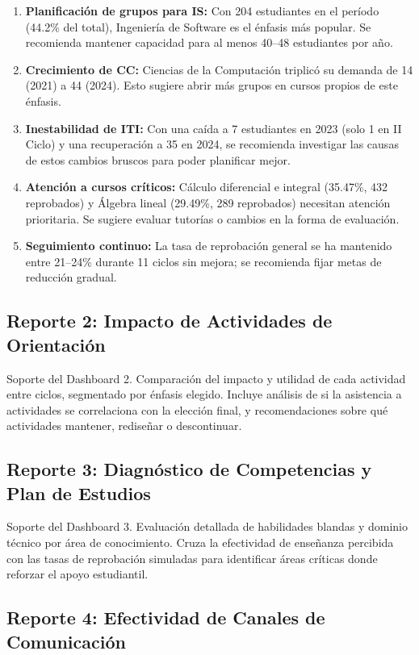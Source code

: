 \documentclass[12pt, letterpaper]{article}
\begin{document}
\begin{enumerate}
  \item \textbf{Planificación de grupos para IS:} Con 204 estudiantes en el período (44.2\% del total), Ingeniería de Software es el énfasis más popular. Se recomienda mantener capacidad para al menos 40--48 estudiantes por año.
  \item \textbf{Crecimiento de CC:} Ciencias de la Computación triplicó su demanda de 14 (2021) a 44 (2024). Esto sugiere abrir más grupos en cursos propios de este énfasis.
  \item \textbf{Inestabilidad de ITI:} Con una caída a 7 estudiantes en 2023 (solo 1 en II Ciclo) y una recuperación a 35 en 2024, se recomienda investigar las causas de estos cambios bruscos para poder planificar mejor.
  \item \textbf{Atención a cursos críticos:} Cálculo diferencial e integral (35.47\%, 432 reprobados) y Álgebra lineal (29.49\%, 289 reprobados) necesitan atención prioritaria. Se sugiere evaluar tutorías o cambios en la forma de evaluación.
  \item \textbf{Seguimiento continuo:} La tasa de reprobación general se ha mantenido entre 21--24\% durante 11 ciclos sin mejora; se recomienda fijar metas de reducción gradual.
\end{enumerate}

\subsection{Reporte 2: Impacto de Actividades de Orientación}

Soporte del Dashboard 2. Comparación del impacto y utilidad de cada actividad entre ciclos, segmentado por énfasis elegido. Incluye análisis de si la asistencia a actividades se correlaciona con la elección final, y recomendaciones sobre qué actividades mantener, rediseñar o descontinuar.

\subsection{Reporte 3: Diagnóstico de Competencias y Plan de Estudios}

Soporte del Dashboard 3. Evaluación detallada de habilidades blandas y dominio técnico por área de conocimiento. Cruza la efectividad de enseñanza percibida con las tasas de reprobación simuladas para identificar áreas críticas donde reforzar el apoyo estudiantil.

\subsection{Reporte 4: Efectividad de Canales de Comunicación}
\end{document}
